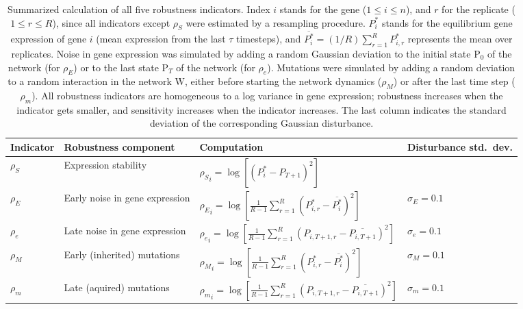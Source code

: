 \documentclass[10pt,a4paper]{article}
\newcommand{\stability}{{\rho_S}}
\newcommand{\earlyenv}{{\rho_E}}
\newcommand{\lateenv}{{\rho_e}}
\newcommand{\earlymut}{{\rho_M}}
\newcommand{\latemut}{{\rho_m}}
\newcommand{\Pp}{\bm{\mathrm P}}
\begin{document}
\begin{table}
\begin{adjustwidth}{-1in}{0in}
\begin{flushright}
\begin{tabular}{lp{3.5cm}ll}
Indicator & Robustness component & Computation & Disturbance std.\ dev. \\ \hline
$\stability$ & \raggedright Expression stability & $\stability_i = \log[( P_i^* - P_{T+1})^2]$ & \\
$\earlyenv$ & \raggedright  Early noise in gene \mbox{expression} & $\earlyenv_i = \log [ \frac{1}{R-1} \sum_{r=1}^R (P_{i,r}^* - \overline{P_{i}^*})^2 ]$ & $\sigma_E=0.1$\\
$\lateenv$  & \raggedright  Late noise in gene \mbox{expression} & $\lateenv_i = \log [ \frac{1}{R-1} \sum_{r=1}^R (P_{i,T+1,r} - \overline{P_{i,T+1}})^2]$ & $\sigma_e=0.1$\\
$\earlymut$ & \raggedright  Early (inherited) \mbox{mutations} & $\earlymut_i = \log[ \frac{1}{R-1} \sum_{r=1}^R (P_{i,r}^* - \overline{P_{i}^*})^2]$ & $\sigma_M = 0.1$\\
$\latemut$ & \raggedright  Late (aquired) \mbox{mutations} & $\latemut_i = \log [ \frac{1}{R-1} \sum_{r=1}^R (P_{i,T+1,r} - \overline{P_{i,T+1}})^2]$ & $\sigma_m = 0.1$ 
\end{tabular}
\caption{\color{Gray}  \label{tab:indicators} Summarized calculation of all five robustness indicators. Index $i$ stands for the gene ($1 \leq i \leq n$), and $r$ for the replicate ($1 \leq r \leq R$), since all indicators except $\stability$ were estimated by a resampling procedure. $P_i^*$ stands for the equilibrium gene expression of gene $i$ (mean expression from the last $\tau$ timesteps), and $\overline{P_{i}^*} = (1/R)\sum_{r=1}^R P_{i,r}^*$ represents the mean over replicates. Noise in gene expression was simulated by adding a random Gaussian deviation to the initial state $\Pp_0$ of the network (for $\earlyenv$) or to the last state $\Pp_T$ of the network (for $\lateenv$). Mutations were simulated by adding a random deviation to a random interaction in the network $\bm{\mathrm W}$, either before starting the network dynamics ($\earlymut$) or after the last time step ($\latemut$). All robustness indicators are homogeneous to a log variance in gene expression; robustness increases when the indicator gets smaller, and sensitivity increases when the indicator increases. The last column indicates the standard deviation of the corresponding Gaussian disturbance. }
\end{flushright}\end{adjustwidth}
\end{table}
\end{document}
